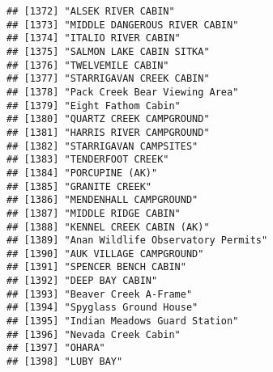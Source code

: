 \documentclass[
]{article}
\begin{document}
\begin{verbatim}
## [1372] "ALSEK RIVER CABIN"                                                                   
## [1373] "MIDDLE DANGEROUS RIVER CABIN"                                                        
## [1374] "ITALIO RIVER CABIN"                                                                  
## [1375] "SALMON LAKE CABIN SITKA"                                                             
## [1376] "TWELVEMILE CABIN"                                                                    
## [1377] "STARRIGAVAN CREEK CABIN"                                                             
## [1378] "Pack Creek Bear Viewing Area"                                                        
## [1379] "Eight Fathom Cabin"                                                                  
## [1380] "QUARTZ CREEK CAMPGROUND"                                                             
## [1381] "HARRIS RIVER CAMPGROUND"                                                             
## [1382] "STARRIGAVAN CAMPSITES"                                                               
## [1383] "TENDERFOOT CREEK"                                                                    
## [1384] "PORCUPINE (AK)"                                                                      
## [1385] "GRANITE CREEK"                                                                       
## [1386] "MENDENHALL CAMPGROUND"                                                               
## [1387] "MIDDLE RIDGE CABIN"                                                                  
## [1388] "KENNEL CREEK CABIN (AK)"                                                             
## [1389] "Anan Wildlife Observatory Permits"                                                   
## [1390] "AUK VILLAGE CAMPGROUND"                                                              
## [1391] "SPENCER BENCH CABIN"                                                                 
## [1392] "DEEP BAY CABIN"                                                                      
## [1393] "Beaver Creek A-Frame"                                                                
## [1394] "Spyglass Ground House"                                                               
## [1395] "Indian Meadows Guard Station"                                                        
## [1396] "Nevada Creek Cabin"                                                                  
## [1397] "OHARA"                                                                               
## [1398] "LUBY BAY"                                                                            

\end{verbatim}
\end{document}
